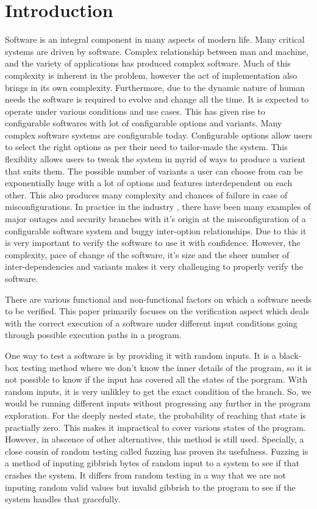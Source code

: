 \documentclass[	runningheads,
				a4paper]{llncs}
\begin{document}
\section{Introduction}
Software is an integral component in many aspects of modern life. Many critical systems are driven by software. Complex relationship between man and machine, and the variety of applications has produced complex software. Much of this complexity is inherent in the problem, however the act of implementation also brings in its own complexity. Furthermore, due to the dynamic nature of human needs the software is required to evolve and change all the time. It is expected to operate under various conditions and use cases. This has given rise to configurable softwares with lot of configurable options and variants. Many complex software systems are configurable today. Configurable options allow users to select the right options as per their need to tailor-made the system. This flexiblity allows users to tweak the system in myrid of ways to produce a varient that suits them. The possible number of variants a user can choose from can be exponentially huge with a lot of options and features interdependent on each other. This also produces many complexity and chances of failure in case of misconfigurations. In practice in the industry \cite[Holistic configuration management at faceboo]{tang2015holistic}, there have been many examples of major outages and security branches with it's origin at the misconfiguration of a configurable software system and buggy inter-option relationships. Due to this it is very important to verify the software to use it with confidence. However, the complexity, pace of change of the software, it's size and the sheer number of inter-dependencies and variants makes it very challenging to properly verify the software. 

There are various functional and non-functional factors on which a software needs to be verified. This paper primarily focuses on the verification aspect which deals with the correct execution of a software under different input conditions going through possible execution paths in a program.

One way to test a software is by providing it with random inputs. It is a black-box testing method where we don't know the inner details of the program, so it is not possible to know if the input has covered all the states of the porgram. With random inputs, it is very unlikley to get the exact condition of the branch. So, we would be running different inputs without progressing any further in the program exploration. For the deeply nested state, the probability of reaching that state is practially zero. This makes it impractical to cover various states of the program. However, in abscence of other alternatives, this method is still used. Specially, a close cousin of random testing called fuzzing \cite{miller1990empirical} has proven its usefulness. Fuzzing is a method of inputing gibbrish bytes of random input to a system to see if that crashes the system. It differs from random testing in a way that we are not inputing random valid values but invalid gibbrish to the program to see if the system handles that gracefully.
\end{document}

